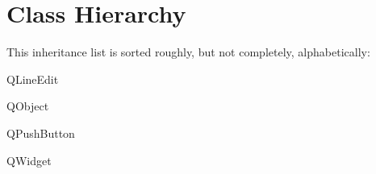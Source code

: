 \section{Class Hierarchy}
This inheritance list is sorted roughly, but not completely, alphabetically\+:\begin{DoxyCompactList}
\item {}
\item {}
\item {}
\item Q\+Line\+Edit\begin{DoxyCompactList}
\item {}
\end{DoxyCompactList}
\item Q\+Object\begin{DoxyCompactList}
\item {}
\item {}
\end{DoxyCompactList}
\item Q\+Push\+Button\begin{DoxyCompactList}
\item {}
\end{DoxyCompactList}
\item Q\+Widget\begin{DoxyCompactList}
\item {}
\end{DoxyCompactList}
\item {}
\end{DoxyCompactList}
